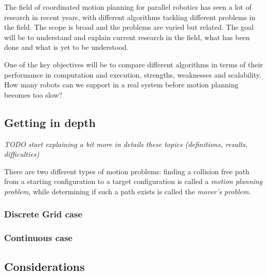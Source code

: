 The field of coordinated motion planning for parallel robotics has seen a lot of research in recent years, with different algorithms tackling different problems in the field. 
The scope is broad and the problems are varied but related. 
The goal will be to understand and explain current research in the field, what has been done and what is yet to be understood.

One of the key objectives will be to compare different algorithms in terms of their performance in computation and execution, strengths, weaknesses and scalability. How many robots can we support in a real system before motion planning becomes too slow? 

\subsection{Getting in depth}

\emph{TODO start explaining a bit more in details these topics (definitions, results, difficulties)}

There are two different types of motion problems: finding a collision free path from a starting configuration to a target configuration is called a \emph{motion planning problem}, while determining if such a path exists is called the \emph{mover's problem}. \cite{hopcroftReducingMultipleObject1986} 


\subsubsection{Discrete Grid case}



\subsubsection{Continuous case}


\subsection{Considerations}